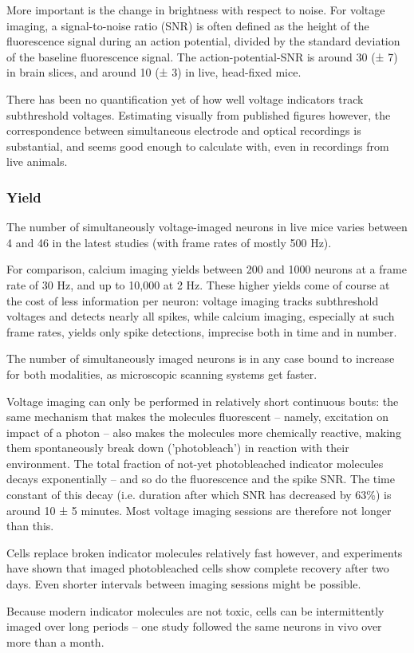 More important is the change in brightness with respect to noise. For voltage imaging, a signal-to-noise ratio (SNR) is often defined as the height of the fluorescence signal during an action potential, divided by the standard deviation of the baseline fluorescence signal.  The action-potential-SNR is around 30 (± 7) in brain slices, and around 10 (± 3) in live, head-fixed mice.

There has been no quantification yet of how well voltage indicators track subthreshold voltages. Estimating visually from published figures however, the correspondence between simultaneous electrode and optical recordings is substantial, and seems good enough to calculate with, even in recordings from live animals.


\subsubsection{Yield}

The number of simultaneously voltage-imaged neurons in live mice varies between 4 and 46 in the latest studies (with frame rates of mostly 500 Hz).

For comparison, calcium imaging yields between 200 and 1000 neurons at a frame rate of 30 Hz, and up to 10,000 at 2 Hz. These higher yields come of course at the cost of less information per neuron: voltage imaging tracks subthreshold voltages and detects nearly all spikes, while calcium imaging, especially at such frame rates, yields only spike detections, imprecise both in time and in number.

The number of simultaneously imaged neurons is in any case bound to increase for both modalities, as microscopic scanning systems get faster.

Voltage imaging can only be performed in relatively short continuous bouts: the same mechanism that makes the molecules fluorescent -- namely, excitation on impact of a photon -- also makes the molecules more chemically reactive, making them spontaneously break down ('photobleach') in reaction with their environment. The total fraction of not-yet photobleached indicator molecules decays exponentially -- and so do the fluorescence and the spike SNR. The time constant of this decay (i.e. duration after which SNR has decreased by 63\%) is around 10 ± 5 minutes. Most voltage imaging sessions are therefore not longer than this.

Cells replace broken indicator molecules relatively fast however, and experiments have shown that imaged photobleached cells show complete recovery after two days. Even shorter intervals between imaging sessions might be possible.

Because modern indicator molecules are not toxic, cells can be intermittently imaged over long periods -- one study followed the same neurons in vivo over more than a month.
